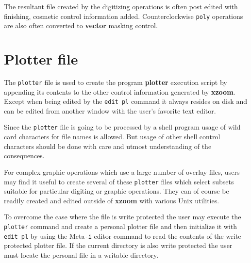 The resultant file created by the digitizing operations is often
post edited with finishing, cosmetic control information added.
Counterclockwise {\tt poly} operations are also often converted to {\bf vector}
masking control.
\section{Plotter file}
The {\tt plotter} file is used to create the program {\bf plotter}
execution script by appending its contents to the other
control information generated by {\bf xzoom}.
Except when being edited by the {\tt edit pl} command it
always resides on disk and can be edited from another window
with the user's favorite text editor.

Since the {\tt plotter} file is going to be processed by
a shell program usage of wild card characters for file
names is allowed.
But usage of other shell control characters should be done
with care and utmost understanding of the consequences.

For complex graphic operations which use a large number of
overlay files, users may find it useful to create several
of these {\tt plotter} files which select subsets suitable
for particular digiting or graphic operations.
They can of course be readily created and edited outside of {\bf xzoom}
with various {\sc Unix} utilities.

To overcome the case where the file is write protected
the user may execute the {\tt plotter} command
and create a personal plotter file and then initialize it
with {\tt edit pl} by using the Meta{\tt -i} editor command
to read the contents of the write protected plotter file.
If the current directory is also write protected the user must
locate the personal file in a writable directory.



